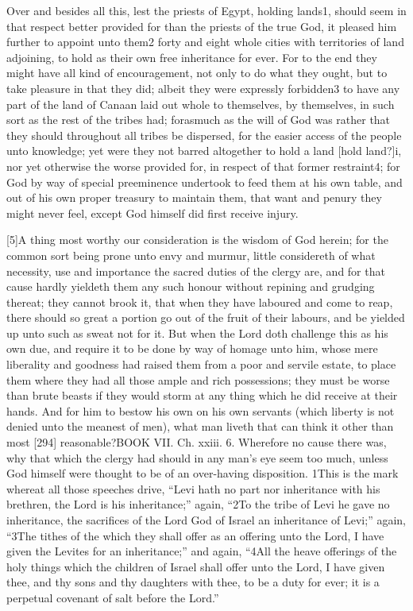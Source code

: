 Over and besides all this, lest the priests of Egypt, holding lands1, should seem in that respect better provided for than the priests of the true God, it pleased him further to appoint unto them2 forty and eight whole cities with territories of land adjoining, to hold as their own free inheritance for ever. For to the end they might have all kind of encouragement, not only to do what they ought, but to take pleasure in that they did; albeit they were expressly forbidden3 to have any part of the land of Canaan laid out whole to themselves, by themselves, in such sort as the rest of the tribes had; forasmuch as the will of God was rather that they should throughout all tribes be dispersed, for the easier access of the people unto knowledge; yet were they not barred altogether to hold a land [hold land?]i, nor yet otherwise the worse provided for, in respect of that former restraint4; for God by way of special preeminence undertook to feed them at his own table, and out of his own proper treasury to maintain them, that want and penury they might never feel, except God himself did first receive injury.

[5]A thing most worthy our consideration is the wisdom of God herein; for the common sort being prone unto envy and murmur, little considereth of what necessity, use and importance the sacred duties of the clergy are, and for that cause hardly yieldeth them any such honour without repining and grudging thereat; they cannot brook it, that when they have laboured and come to reap, there should so great a portion go out of the fruit of their labours, and be yielded up unto such as sweat not for it. But when the Lord doth challenge this as his own due, and require it to be done by way of homage unto him, whose mere liberality and goodness had raised them from a poor and servile estate, to place them where they had all those ample and rich possessions; they must be worse than brute beasts if they would storm at any thing which he did receive at their hands. And for him to bestow his own on his own servants (which liberty is not denied unto the meanest of men), what man liveth that can think it other than most [294] reasonable?BOOK VII. Ch. xxiii. 6. Wherefore no cause there was, why that which the clergy had should in any man’s eye seem too much, unless God himself were thought to be of an over-having disposition. 1This is the mark whereat all those speeches drive, “Levi hath no part nor inheritance with his brethren, the Lord is his inheritance;” again, “2To the tribe of Levi he gave no inheritance, the sacrifices of the Lord God of Israel an inheritance of Levi;” again, “3The tithes of the which they shall offer as an offering unto the Lord, I have given the Levites for an inheritance;” and again, “4All the heave offerings of the holy things which the children of Israel shall offer unto the Lord, I have given thee, and thy sons and thy daughters with thee, to be a duty for ever; it is a perpetual covenant of salt before the Lord.”

